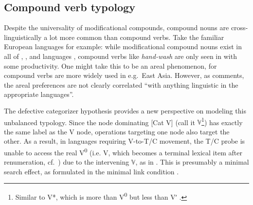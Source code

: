 \documentclass[output=paper]{langsci/langscibook}
\begin{document}
\subsection{Compound verb typology}\label{sec5.3}

Despite the universality of modificational compounds, compound nouns are\linebreak
cross-linguistically a lot more common than compound verbs. Take the familiar
Eu\-ro\-pean languages for example: while modificational compound nouns exist
in all of , , and  languages \citep[cf.][]{Bauer2009},
compound verbs like {\it hand-wash} are only seen in  with some
productivity. One might take this to be an areal phenomenon, for compound verbs
are more widely used in e.g.\ East Asia. However, as \citet[355]{Bauer2009}
comments, the areal preferences are not clearly correlated ``with anything
linguistic in the appropriate languages''.

The defective categorizer hypothesis provides a new perspective on modeling
this unbalanced typology. Since the node dominating
[Cat\textsubscript{\textsurd} V\textsubscript{\textsurd}] (call it
$\mathbb{V}$\footnote{Similar to  V*, which is more than
V\textsuperscript{0} but less than V$ʹ$ \citep[cf.][]{Vikner2005}.}) has exactly
the same label as the V\textsubscript{\textsurd} node, operations targeting one
node also target the other. As a result, in languages requiring V-to-T/C
movement, the T/C probe is unable to access the real V\textsuperscript{0} (i.e.
V\textsubscript{\textsurd}, which becomes a terminal lexical item after
renumeration, cf.\ ) due to the intervening $\mathbb{V}$, as in
. This is presumably a minimal search effect, as formulated in the
minimal link condition .
\end{document}
